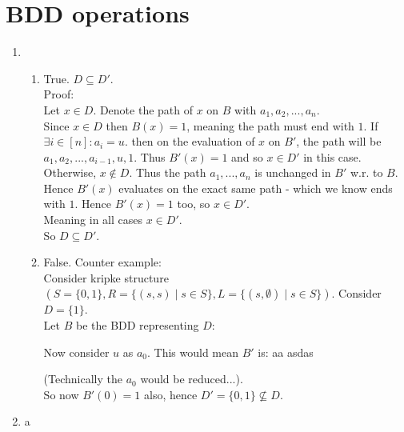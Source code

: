 \documentclass{article}
\begin{document}
\section{BDD operations}
\begin{enumerate}[label=\textbf{\alph*.}]
\item
    \begin{enumerate}[label=\textbf{\arabic*.}]
    \item True. $D\subseteq D'$.\\
        Proof:\\
        Let $x\in D$. Denote the path of $x$ on $B$ with $a_1,a_2,...,a_n$.\\
        Since $x\in D$ then $B(x)=1$, meaning the path must end with $1$.
        If $\exists i\in[n]: a_i=u$.
        then on the evaluation of $x$ on $B'$,
        the path will be $a_1,a_2,...,a_{i-1},u,1$.
        Thus $B'(x)=1$ and so $x\in D'$ in this case.\\
        Otherwise, $x\notin D$. Thus the path $a_1,...,a_n$ is
        unchanged in $B'$ w.r. to $B$. Hence $B'(x)$ evaluates
        on the exact same path - which we know ends with $1$.
        Hence $B'(x)=1$ too, so $x\in D'$.\\
        Meaning in all cases $x\in D'$.\\
        So $D\subseteq D'$.
    \item False. %
        Counter example:\\
        Consider kripke structure $(S=\{0,1\},R=\{(s,s)\mid s\in S\},L=\{(s,\emptyset)\mid s\in S\})$.
        Consider $D=\{1\}$.\\
        Let $B$ be the BDD representing $D$:\\
        \begin{center}\end{center}
        Now consider $u$ as $a_0$. This would mean $B'$ is: aa asdas
        \begin{center}\end{center}
        (Technically the $a_0$ would be reduced...).\\
        So now $B'(0)=1$ also, hence $D'=\{0,1\}\not\subseteq D$.
    \end{enumerate}
    \item
    a
\end{enumerate}
\end{document}
